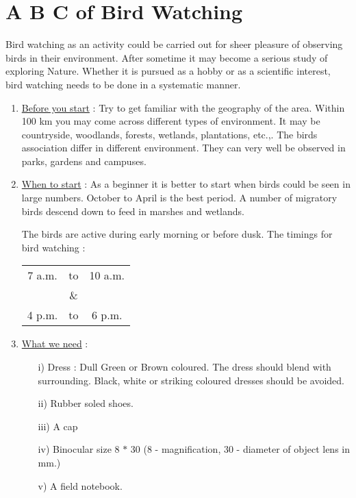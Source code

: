 \chapter{A B C of Bird Watching}%

Bird watching as an activity could be carried out for sheer 
pleasure of observing birds in their environment. After sometime 
it may become a serious study of exploring Nature. Whether it is 
pursued as a hobby or as a scientific interest, bird watching 
needs to be done in a systematic manner. 
\begin{enumerate}
\item \underline{Before you start} : Try to get familiar with the geography of 
the area. Within 100 km you may come across different types 
of environment. It may be countryside, woodlands, forests, 
wetlands, plantations, etc.,. The birds association differ 
in different environment. They can very well be observed in 
parks, gardens and campuses. 

\item \underline{When to start} : As a beginner it is better to start when 
birds could be seen in large numbers. October to April is 
the best period. A number of migratory birds descend down to 
feed in marshes and wetlands. 

The birds are active during early morning or before 
dusk. The timings for bird watching : 
\begin{center}
\begin{tabular}{ccc}
7 a.m. & to & 10 a.m. \\
& \& & \\
4 p.m. & to & 6 p.m.
\end{tabular}
\end{center}

\item \underline{What we need} :
\begin{itemize}
\item[i)] Dress : Dull Green or Brown coloured. The dress should 
blend with surrounding. Black, white or striking coloured 
dresses should be avoided. 

\item[ii)] Rubber soled shoes. 

\item[iii)] A cap 

\item[iv)] Binocular size 8 $\ast$ 30 (8 - magnification, 30 - diameter 
of object lens in mm.) 

\item[v)] A field notebook. 


\end{itemize}
\end{enumerate}
